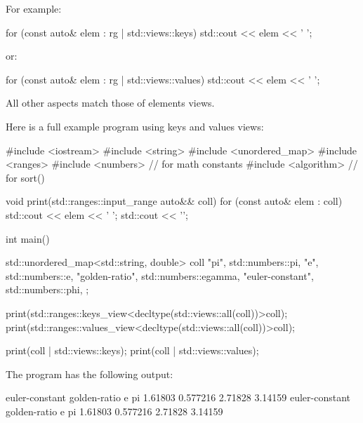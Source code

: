 For example:

\begin{cpp}
for (const auto& elem : rg | std::views::keys) {
	std::cout << elem << ' ';
}
\end{cpp}

or:

\begin{cpp}
for (const auto& elem : rg | std::views::values) {
	std::cout << elem << ' ';
}
\end{cpp}

All other aspects match those of elements views.

Here is a full example program using keys and values views:


\begin{cpp}
#include <iostream>
#include <string>
#include <unordered_map>
#include <ranges>
#include <numbers> // for math constants
#include <algorithm> // for sort()

void print(std::ranges::input_range auto&& coll)
{
	for (const auto& elem : coll) {
		std::cout << elem << ' ';
	}
	std::cout << '\n';
}

int main()
{
	std::unordered_map<std::string, double> coll{
		{"pi", std::numbers::pi},
		{"e", std::numbers::e},
		{"golden-ratio", std::numbers::egamma},
		{"euler-constant", std::numbers::phi},
	};
	
	print(std::ranges::keys_view<decltype(std::views::all(coll))>{coll});
	print(std::ranges::values_view<decltype(std::views::all(coll))>{coll});
	
	print(coll | std::views::keys);
	print(coll | std::views::values);
}
\end{cpp}

The program has the following output:

\begin{shell}
euler-constant golden-ratio e pi
1.61803 0.577216 2.71828 3.14159
euler-constant golden-ratio e pi
1.61803 0.577216 2.71828 3.14159
\end{shell}











